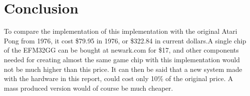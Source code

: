 \section{Conclusion}


To compare the implementation of this implementation with the original Atari
Pong from 1976, it cost \$79.95 in 1976\cite{pongreview}, or \$322.84 in
current dollars.\footnotemark A single chip of the EFM32GG can be bought at
newark.com for \$17, and other components needed for creating almost the same
game chip with this implementation would not be much higher than this price. It
can then be said that a new system made with the hardware in this report, could
cost only 10\% of the original price. A mass produced version would of course
be much cheaper.

